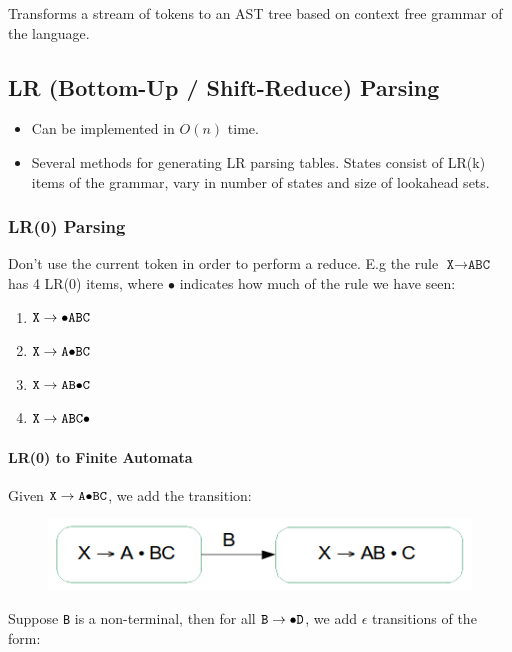 \documentclass[twocolumn,english]{article}
\begin{document}
Transforms a stream of tokens to an AST tree based on context free
grammar of the language.

\subsection{LR (Bottom-Up / Shift-Reduce) Parsing}
\begin{itemize}
\item Can be implemented in $O(n)$ time.
\item Several methods for generating LR parsing tables. States consist of
LR(k) items of the grammar, vary in number of states and size of lookahead
sets.
\end{itemize}

\subsubsection{LR(0) Parsing}

Don't use the current token in order to perform a reduce. E.g the
rule $\texttt{X}\rightarrow\texttt{ABC}$ has 4 LR(0) items, where
$\bullet$ indicates how much of the rule we have seen:
\begin{enumerate}
\item $\texttt{X}\rightarrow\texttt{\ensuremath{\bullet}ABC}$ 
\item $\texttt{X}\rightarrow\texttt{A\ensuremath{\bullet}BC}$ 
\item $\texttt{X}\rightarrow\texttt{AB\ensuremath{\bullet}C}$ 
\item $\texttt{X}\rightarrow\texttt{ABC\ensuremath{\bullet}}$ 
\end{enumerate}

\paragraph{LR(0) to Finite Automata}

Given $\texttt{X}\rightarrow\texttt{A\ensuremath{\bullet}BC}$, we
add the transition:

\begin{figure}[H]
\centering{}\includegraphics[width=0.4\linewidth]{img/lr0tonfa}
\end{figure}

Suppose \texttt{B} is a non-terminal, then for all $\texttt{B}\rightarrow\texttt{\ensuremath{\bullet}D}$,
we add $\epsilon$ transitions of the form:
\end{document}
